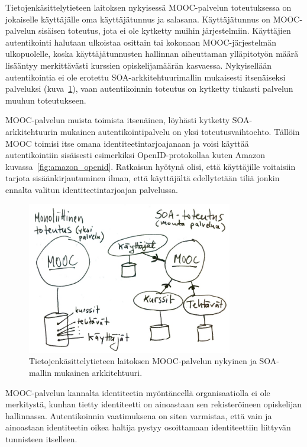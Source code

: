 \documentclass[finnish,gradu]{tktltiki}
\begin{document}
  Tietojenkäsittelytieteen laitoksen nykyisessä MOOC-palvelun toteutuksessa on jokaiselle käyttäjälle oma käyttäjätunnus ja salasana. Käyttäjätunnus on MOOC-palvelun sisäisen toteutus, jota ei ole kytketty muihin järjestelmiin. Käyttäjien autentikointi halutaan ulkoistaa osittain tai kokonaan MOOC-järjestelmän ulkopuolelle, koska käyttäjätunnusten hallinnan aiheuttaman ylläpitotyön määrä lisääntyy merkittävästi kurssien opiskelijamäärän kasvaessa. Nykyisellään autentikointia ei ole erotettu SOA-arkkitehtuurimallin mukaisesti itsenäiseksi palveluksi (kuva~\ref{fig:mooc-arkkitehtuuri}), vaan autentikoinnin toteutus on kytketty tiukasti palvelun muuhun toteutukseen.

  MOOC-palvelun muista toimista itsenäinen, löyhästi kytketty SOA-arkkitehtuurin mukainen autentikointipalvelu on yksi toteutusvaihtoehto. Tällöin MOOC toimisi itse omana identiteetintarjoajanaan ja voisi käyttää autentikointiin sisäisesti esimerkiksi OpenID-protokollaa kuten Amazon kuvassa~\ref{fig:amazon_openid}. Ratkaisun hyötynä olisi, että käyttäjille voitaisiin tarjota sisäänkirjautuminen ilman, että käyttäjältä edellytetään tiliä jonkin ennalta valitun identiteetintarjoajan palvelussa.


  \begin{figure}[h!]
    \centering
    \includegraphics[width=0.8\textwidth]{images/mooc-arkkitehtuuri.jpg}
    \caption{Tietojenkäsittelytieteen laitoksen MOOC-palvelun nykyinen ja SOA-mallin mukainen arkkitehtuuri.}
    \label{fig:mooc-arkkitehtuuri}
  \end{figure}

   MOOC-palvelun kannalta identiteetin myöntäneellä organisaatiolla ei ole merkitystä, kunhan tietty identiteetti on ainoastaan sen rekisteröineen opiskelijan hallinnassa. Autentikoinnin vaatimuksena on siten varmistaa, että vain ja ainoastaan identiteetin oikea haltija pystyy osoittamaan identiteettiin liittyvän tunnisteen itselleen.
\end{document}
